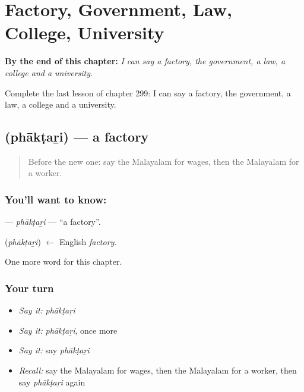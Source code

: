 
\chapter{Factory, Government, Law, College, University}
\label{ch:ml-factory-government-law-college-university}

\begin{chapteropening}
\textbf{By the end of this chapter:} \emph{I can say a factory, the government, a law, a college and a university.}

Complete the last lesson of chapter 299: I can say a factory, the government, a law, a college and a university.
\end{chapteropening}

\section[\texorpdfstring{\ml{ഫാക്ടറി} (phākṭaṟi)}{ഫാക്ടറി (phākṭaṟi)}]{ (phākṭaṟi) — a factory}

\label{lesson:ML-C299-phaktari}



\begin{quote}
Before the new one: say the Malayalam for wages, then the Malayalam for a worker.
\end{quote}

\subsection*{You'll want to know: }
\textbf{} — \emph{phākṭaṟi} — \textquotedblleft{}a factory\textquotedblright{}.

\begin{cousinweb}
\textbf{} (\emph{phākṭaṟi}) $\leftarrow$ English \emph{factory}.
\end{cousinweb}

\begin{grammarlens}[title={What you've built}]
One more word for this chapter.
\end{grammarlens}

\subsection*{Your turn}
\begin{itemize}
\raggedright
  \item \emph{Say it:} \emph{phākṭaṟi}
  \item \emph{Say it:} \emph{phākṭaṟi}, once more
  \item \emph{Say it:} say \emph{phākṭaṟi}
  \item \emph{Recall:} say the Malayalam for wages, then the Malayalam for a worker, then say \emph{phākṭaṟi} again
\end{itemize}

